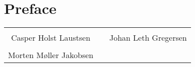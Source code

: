 \thispagestyle{empty}
\section*{Preface}


\begin{table}[H]
	\centering
	\vspace{2cm}
		\begin{tabular}{c c c}
			\underline{\phantom{JAERJAERJAERJAERGO}} & \phantom{cookies} & \underline{\phantom{JAERJAERJAERJAERGO}} \\
			Casper Holst Laustsen & \phantom{cookies} & Johan Leth Gregersen\\[1.5cm]
		    \underline{\phantom{JAERJAERJAERJAERGO}} & \phantom{cookies} & {\phantom{JAERJAERJAERJAERGO}} \\
			Morten Møller Jakobsen & \phantom{cookies} & \\[1.5cm]				
		\end{tabular}
\end{table}
